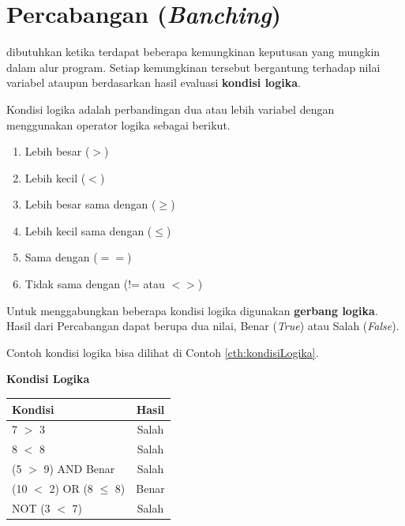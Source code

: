 \section{Percabangan (\textit{Banching})}
 dibutuhkan ketika terdapat beberapa kemungkinan keputusan yang mungkin dalam alur program. Setiap kemungkinan tersebut bergantung terhadap nilai variabel ataupun berdasarkan hasil evaluasi \textbf{kondisi logika}. 

Kondisi logika adalah perbandingan dua atau lebih variabel dengan menggunakan operator logika sebagai berikut.
\begin{enumerate}
	\item Lebih besar ($>$)
	\item Lebih kecil ($<$)
	\item Lebih besar sama dengan ($\geq$)
	\item Lebih kecil sama dengan ($\leq$)
	\item Sama dengan ($==$)
	\item Tidak sama dengan (!= atau $<>$)
\end{enumerate}

Untuk menggabungkan beberapa kondisi logika digunakan \textbf{gerbang logika}.\\
Hasil dari Percabangan dapat berupa dua nilai, Benar (\textit{True}) atau Salah (\textit{False}).

Contoh kondisi logika bisa dilihat di Contoh \ref{cth:kondisiLogika}.
\begin{contoh}
\label{cth:kondisiLogika}
\textbf{Kondisi Logika}\\

\begin{table}
	\centering
	\begin{tabular}{  l  c  }
	\hline
	Kondisi & Hasil \\
	\hline
	7 $>$ 3 & Salah \\
	8 $<$ 8 & Salah \\
	(5 $>$ 9) AND Benar & Salah \\
	(10 $<$ 2) OR (8 $\leq$ 8) & Benar \\
	NOT (3 $<$ 7) & Salah \\
	\hline
	\end{tabular}
\label{table:tabellogika}
\end{table}
\end{contoh}


